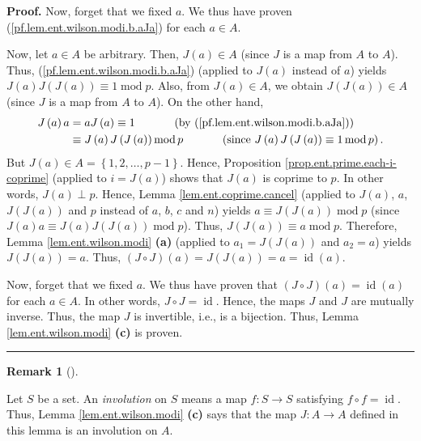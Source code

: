 \documentclass[numbers=enddot,12pt,final,onecolumn,notitlepage]{scrartcl}%
\numberwithin{exer}{subsection}
\theoremstyle{definition}
\newtheorem{remk}[theo]{Remark}
\newenvironment{remark}[1][]
{\begin{remk}[#1]\begin{leftbar}}
{\end{leftbar}\end{remk}}
\newenvironment{proof}[1][Proof]{\noindent\textbf{#1.} }{\ \rule{0.5em}{0.5em}}
\begin{document}
\begin{proof}
Now, forget that we fixed $a$. We thus have proven
(\ref{pf.lem.ent.wilson.modi.b.aJa}) for each $a\in A$.

Now, let $a\in A$ be arbitrary. Then, $J\left(  a\right)  \in A$ (since $J$ is
a map from $A$ to $A$). Thus, (\ref{pf.lem.ent.wilson.modi.b.aJa}) (applied to
$J\left(  a\right)  $ instead of $a$) yields $J\left(  a\right)  J\left(
J\left(  a\right)  \right)  \equiv1\operatorname{mod}p$. Also, from $J\left(
a\right)  \in A$, we obtain $J\left(  J\left(  a\right)  \right)  \in A$
(since $J$ is a map from $A$ to $A$). On the other hand,%
\begin{align*}
J\left(  a\right)  a  &  =aJ\left(  a\right)  \equiv
1\ \ \ \ \ \ \ \ \ \ \left(  \text{by (\ref{pf.lem.ent.wilson.modi.b.aJa}%
)}\right) \\
&  \equiv J\left(  a\right)  J\left(  J\left(  a\right)  \right)
\operatorname{mod}p\ \ \ \ \ \ \ \ \ \ \left(  \text{since }J\left(  a\right)
J\left(  J\left(  a\right)  \right)  \equiv1\operatorname{mod}p\right)  .
\end{align*}
But $J\left(  a\right)  \in A=\left\{  1,2,\ldots,p-1\right\}  $. Hence,
Proposition \ref{prop.ent.prime.each-i-coprime} (applied to $i=J\left(
a\right)  $) shows that $J\left(  a\right)  $ is coprime to $p$. In other
words, $J\left(  a\right)  \perp p$. Hence, Lemma \ref{lem.ent.coprime.cancel}
(applied to $J\left(  a\right)  $, $a$, $J\left(  J\left(  a\right)  \right)
$ and $p$ instead of $a$, $b$, $c$ and $n$) yields $a\equiv J\left(  J\left(
a\right)  \right)  \operatorname{mod}p$ (since $J\left(  a\right)  a\equiv
J\left(  a\right)  J\left(  J\left(  a\right)  \right)  \operatorname{mod}p$).
Thus, $J\left(  J\left(  a\right)  \right)  \equiv a\operatorname{mod}p$.
Therefore, Lemma \ref{lem.ent.wilson.modi} \textbf{(a)} (applied to
$a_{1}=J\left(  J\left(  a\right)  \right)  $ and $a_{2}=a$) yields $J\left(
J\left(  a\right)  \right)  =a$. Thus, $\left(  J\circ J\right)  \left(
a\right)  =J\left(  J\left(  a\right)  \right)  =a=\operatorname*{id}\left(
a\right)  $.

Now, forget that we fixed $a$. We thus have proven that $\left(  J\circ
J\right)  \left(  a\right)  =\operatorname*{id}\left(  a\right)  $ for each
$a\in A$. In other words, $J\circ J=\operatorname*{id}$. Hence, the maps $J$
and $J$ are mutually inverse. Thus, the map $J$ is invertible, i.e., is a
bijection. Thus, Lemma \ref{lem.ent.wilson.modi} \textbf{(c)} is proven.
\end{proof}

\begin{remark}
Let $S$ be a set. An \textit{involution} on $S$ means a map $f:S\rightarrow S$
satisfying $f\circ f=\operatorname*{id}$. Thus, Lemma
\ref{lem.ent.wilson.modi} \textbf{(c)} says that the map $J:A\rightarrow A$
defined in this lemma is an involution on $A$.
\end{remark}
\end{document}
